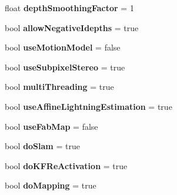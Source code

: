 \begin{DoxyCompactItemize}
\item 
\hypertarget{namespacelsd__slam_a29329004c5250b66a080eef03894cbe5}{float {\bfseries depth\-Smoothing\-Factor} = 1}\label{namespacelsd__slam_a29329004c5250b66a080eef03894cbe5}

\item 
\hypertarget{namespacelsd__slam_ae7b46fd44c8b8c632d2e85c68d718508}{bool {\bfseries allow\-Negative\-Idepths} = true}\label{namespacelsd__slam_ae7b46fd44c8b8c632d2e85c68d718508}

\item 
\hypertarget{namespacelsd__slam_a621ec1b717fa027b73aa25f87b2b4b8a}{bool {\bfseries use\-Motion\-Model} = false}\label{namespacelsd__slam_a621ec1b717fa027b73aa25f87b2b4b8a}

\item 
\hypertarget{namespacelsd__slam_aa92febcbae5cd0bd56e0f5231976c995}{bool {\bfseries use\-Subpixel\-Stereo} = true}\label{namespacelsd__slam_aa92febcbae5cd0bd56e0f5231976c995}

\item 
\hypertarget{namespacelsd__slam_af9ef902c8e6cae549e90cc06143765da}{bool {\bfseries multi\-Threading} = true}\label{namespacelsd__slam_af9ef902c8e6cae549e90cc06143765da}

\item 
\hypertarget{namespacelsd__slam_a9fafc76b866e7ce35b72cc2a48483c53}{bool {\bfseries use\-Affine\-Lightning\-Estimation} = true}\label{namespacelsd__slam_a9fafc76b866e7ce35b72cc2a48483c53}

\item 
\hypertarget{namespacelsd__slam_a68beecbfced2799e9dd8f5b1f7fb4037}{bool {\bfseries use\-Fab\-Map} = false}\label{namespacelsd__slam_a68beecbfced2799e9dd8f5b1f7fb4037}

\item 
\hypertarget{namespacelsd__slam_a03b00c7da6c34c0d56e59fe376a3a4d3}{bool {\bfseries do\-Slam} = true}\label{namespacelsd__slam_a03b00c7da6c34c0d56e59fe376a3a4d3}

\item 
\hypertarget{namespacelsd__slam_ade98ad2489ba074e1964a5ed8dcd8f7c}{bool {\bfseries do\-K\-F\-Re\-Activation} = true}\label{namespacelsd__slam_ade98ad2489ba074e1964a5ed8dcd8f7c}

\item 
\hypertarget{namespacelsd__slam_ad1a49c64630146ba8ad03d91086d5781}{bool {\bfseries do\-Mapping} = true}\label{namespacelsd__slam_ad1a49c64630146ba8ad03d91086d5781}


\end{DoxyCompactItemize}
